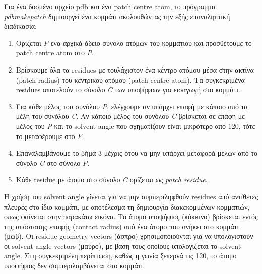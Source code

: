 \medskip
Για ένα δοσμένο αρχείο pdb και ένα patch centre atom, το πρόγραμμα \textit{pdbmakepatch} δημιουργεί ένα κομμάτι ακολουθώντας την εξής επαναληπτική διαδικασία:

\medskip
\begin{enumerate}
    \item Ορίζεται \textit{P} ενα αρχικά άδειο σύνολο ατόμων του κομματιού και προσθέτουμε το patch centre atom στο \textit{P}. \\
    \item Βρίσκουμε όλα τα residues με τουλάχιστον ένα κέντρο ατόμου μέσα στην ακτίνα (patch radius) του κεντρικού ατόμου (patch centre atom). Τα συγκεκριμένα residues αποτελούν το σύνολο \textit{C} των υποψήφιων για εισαγωγή στο κομμάτι. \\
    \item Για κάθε μέλος του συνόλου \textit{P}, ελέγχουμε αν υπάρχει επαφή με κάποιο από τα μέλη του συνόλου \textit{C}. Αν κάποιο μέλος του συνόλου \textit{C} βρίσκεται σε επαφή με μέλος του \textit{P} και το solvent angle που σχηματίζουν είναι μικρότερο από 120\degree , τότε το μεταφέρουμε στο \textit{P}. \\
    \item Επαναλαμβάνουμε το βήμα 3 μέχρις ότου να μην υπάρχει μεταφορά μελών από το σύνολο \textit{C} στο σύνολο \textit{P}. \\
    \item Κάθε residue με άτομο στο σύνολο \textit{C} ορίζεται ως \textit{patch residue}. \\
\end{enumerate}


\bigskip
Η χρήση του solvent angle γίνεται για να μην συμπεριληφθούν residues από αντίθετες πλευρές στο ίδιο κομμάτι, με αποτέλεσμα τη δημιουργία διακεκομμένων κομματιών, οπως φαίνεται στην παρακάτω εικόνα. Το άτομο υποψήφιος (κόκκινο) βρίσκεται εντός της απόστασης επαφής (contact radius) από ένα άτομο που ανήκει στο κομμάτι (μωβ). Οι residue geometry vectors (άσπρο) χρησιμοποιούνται για να υπολογιστούν οι solvent angle vectors (μαύρο), με βάση τους οποίους υπολογίζεται το solvent angle. Στη συγκεκριμένη περίπτωση, καθώς η γωνία ξεπερνά τις 120\degree , το άτομο υποψήφιος δεν συμπεριλαμβάνεται στο κομμάτι. 

